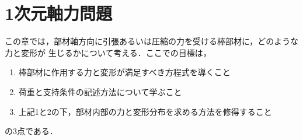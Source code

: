 \documentclass[10pt,a4j]{jbook}
\newlength{\minitwocolumn}
\begin{document}
\newcommand{\fat}[1]{\mbox{\boldmath $#1$}}
\newcommand{\D}{\partial}
\newcommand{\w}{\omega}
\newcommand{\ga}{\alpha}
\newcommand{\gb}{\beta}
\newcommand{\gx}{\xi}
\newcommand{\gz}{\zeta}
\newcommand{\vhat}[1]{\hat{\fat{#1}}}
\newcommand{\spc}{\vspace{0.7\baselineskip}}
\newcommand{\halfspc}{\vspace{0.3\baselineskip}}

\newcommand{\twofig}[2]
 {
   \begin{figure}
     \begin{minipage}[t]{\minitwocolumn}
         \begin{center}   #1
         \end{center}
     \end{minipage}
         \hspace{\columnsep}
     \begin{minipage}[t]{\minitwocolumn}
         \begin{center} #2
         \end{center}
     \end{minipage}
   \end{figure}
 }
\chapter{1次元軸力問題}
この章では，部材軸方向に引張あるいは圧縮の力を受ける棒部材に，どのような力と変形が
生じるかについて考える．ここでの目標は，
\begin{enumerate}
\item
	棒部材に作用する力と変形が満足すべき方程式を導くこと
\item
	荷重と支持条件の記述方法について学ぶこと
\item
	上記1と2の下，部材内部の力と変形分布を求める方法を修得すること
\end{enumerate}
の3点である．
\end{document}
